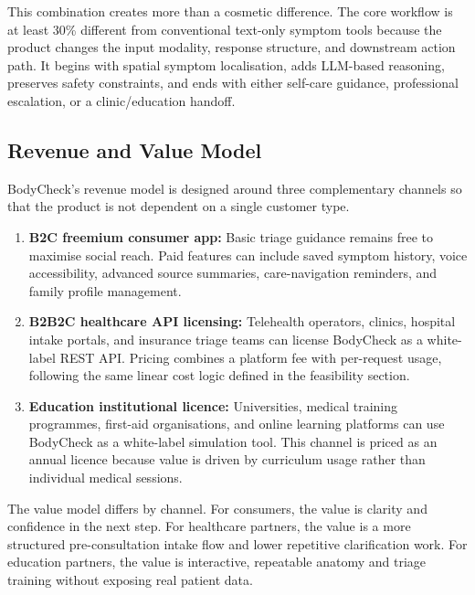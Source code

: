This combination creates more than a cosmetic difference. The core workflow is
at least 30\% different from conventional text-only symptom tools because the
product changes the input modality, response structure, and downstream action
path. It begins with spatial symptom localisation, adds LLM-based reasoning,
preserves safety constraints, and ends with either self-care guidance,
professional escalation, or a clinic/education handoff.

\subsection{Revenue and Value Model}
\label{sec:impact-revenue}

BodyCheck's revenue model is designed around three complementary channels so
that the product is not dependent on a single customer type.

\begin{enumerate}[leftmargin=2em, itemsep=4pt, topsep=4pt]
  \item \textbf{B2C freemium consumer app:}
        Basic triage guidance remains free to maximise social reach. Paid
        features can include saved symptom history, voice accessibility,
        advanced source summaries, care-navigation reminders, and family
        profile management.
  \item \textbf{B2B2C healthcare API licensing:}
        Telehealth operators, clinics, hospital intake portals, and insurance
        triage teams can license BodyCheck as a white-label REST API. Pricing
        combines a platform fee with per-request usage, following the same
        linear cost logic defined in the feasibility section.
  \item \textbf{Education institutional licence:}
        Universities, medical training programmes, first-aid organisations,
        and online learning platforms can use BodyCheck as a white-label
        simulation tool. This channel is priced as an annual licence because
        value is driven by curriculum usage rather than individual medical
        sessions.
\end{enumerate}

The value model differs by channel. For consumers, the value is clarity and
confidence in the next step. For healthcare partners, the value is a more
structured pre-consultation intake flow and lower repetitive clarification
work. For education partners, the value is interactive, repeatable anatomy and
triage training without exposing real patient data.

